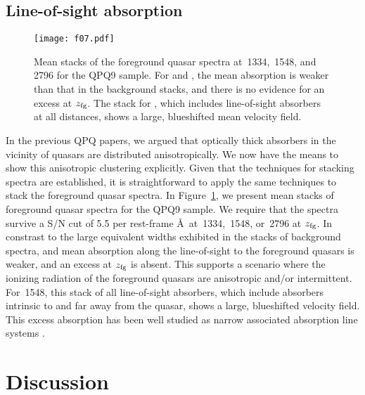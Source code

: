 \documentclass[iop]{emulateapj}
\begin{document}
\subsection{Line-of-sight absorption}
\label{sec:los_stacks}

\begin{figure}
\texttt{[image: f07.pdf]}
\caption{Mean stacks of the foreground quasar spectra at \,1334, \,1548, and 
\,2796 for the QPQ9 sample. For  and , the mean absorption is 
weaker than that in the background stacks, and there is no evidence for an excess at $z_{\rm fg}$. 
The stack for , which includes line-of-sight absorbers at all distances, shows a large, 
blueshifted mean velocity field.
}
\label{fig:stacks_fg}
\end{figure}

In the previous QPQ papers, we argued that optically thick absorbers in the vicinity of quasars 
are distributed anisotropically. We now have the means to show this anisotropic clustering 
explicitly. Given that the techniques for stacking spectra are established, it is straightforward 
to apply the same techniques to stack the foreground quasar spectra. In 
Figure~\ref{fig:stacks_fg}, we present mean stacks of foreground quasar spectra for 
the QPQ9 sample. We require that the spectra survive a S/N cut of 5.5 per rest-frame \AA\ at 
\,1334, \,1548, or \,2796 at $z_{\rm fg}$. In constrast to the 
large equivalent widths exhibited in the stacks of background spectra,  and  
mean absorption along the line-of-sight to the foreground quasars is weaker, and an excess at 
$z_{\rm fg}$ is absent. This supports a scenario where the ionizing radiation of the foreground 
quasars are anisotropic and/or intermittent. For \,1548, this stack of all line-of-sight 
absorbers, which include absorbers intrinsic to and far away from the quasar, shows a large, 
blueshifted velocity field. This excess  absorption has been well studied as narrow 
associated absorption line systems \citep[e.g., ][]{Wild+08}. 

\section{Discussion}
\label{sec:discussion}
\end{document}
